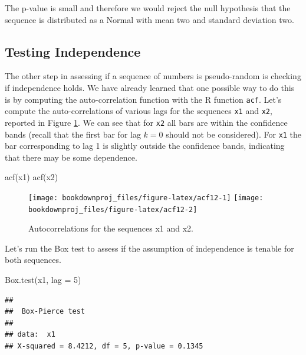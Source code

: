 \documentclass[
]{book}
\newenvironment{Shaded}{\begin{snugshade}}{\end{snugshade}}
\newcommand{\AttributeTok}[1]{\textcolor[rgb]{0.77,0.63,0.00}{#1}}
\newcommand{\DecValTok}[1]{\textcolor[rgb]{0.00,0.00,0.81}{#1}}
\newcommand{\FunctionTok}[1]{\textcolor[rgb]{0.00,0.00,0.00}{#1}}
\newcommand{\NormalTok}[1]{#1}
\theoremstyle{definition}
\theoremstyle{definition}
\theoremstyle{definition}
\theoremstyle{definition}
\theoremstyle{remark}
\begin{document}
The p-value is small and therefore we would reject the null hypothesis that the sequence is distributed as a Normal with mean two and standard deviation two.

\hypertarget{testing-independence-1}{%
\subsection{Testing Independence}\label{testing-independence-1}}

The other step in assessing if a sequence of numbers is pseudo-random is checking if independence holds. We have already learned that one possible way to do this is by computing the auto-correlation function with the R function \texttt{acf}. Let's compute the auto-correlations of various lags for the sequences \texttt{x1} and \texttt{x2}, reported in Figure \ref{fig:acf12}. We can see that for \texttt{x2} all bars are within the confidence bands (recall that the first bar for lag \(k=0\) should not be considered). For \texttt{x1} the bar corresponding to lag 1 is slightly outside the confidence bands, indicating that there may be some dependence.

\begin{Shaded}
\begin{Highlighting}[]
\FunctionTok{acf}\NormalTok{(x1)}
\FunctionTok{acf}\NormalTok{(x2)}
\end{Highlighting}
\end{Shaded}

\begin{figure}

{\centering \texttt{[image: bookdownproj\_files/figure-latex/acf12-1]} \texttt{[image: bookdownproj\_files/figure-latex/acf12-2]} 

}

\caption{Autocorrelations for the sequences x1 and x2.}\label{fig:acf12}
\end{figure}

Let's run the Box test to assess if the assumption of independence is tenable for both sequences.

\begin{Shaded}
\begin{Highlighting}[]
\FunctionTok{Box.test}\NormalTok{(x1, }\AttributeTok{lag =} \DecValTok{5}\NormalTok{)}
\end{Highlighting}
\end{Shaded}

\begin{verbatim}
## 
##  Box-Pierce test
## 
## data:  x1
## X-squared = 8.4212, df = 5, p-value = 0.1345
\end{verbatim}
\end{document}
